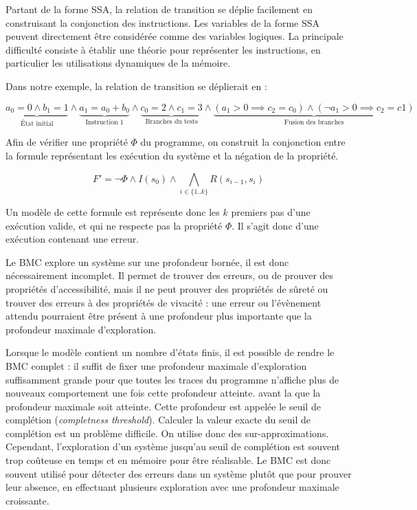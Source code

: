 Partant de la forme SSA, la relation de transition se déplie facilement
en construisant la conjonction des instructions. Les variables de la forme SSA
peuvent directement être considérée comme des variables logiques. La principale
difficulté consiste à établir une théorie pour représenter les
instructions, en particulier les utilisations dynamiques de la mémoire.

Dans notre exemple, la relation de transition se déplierait en :

\[
  \underbrace{a_0 = 0 \land b_1 = 1}_\text{État initial} \land
  \underbrace{a_1 = a_0 + b_0}_\text{Instruction 1} \land
  \underbrace{c_0 = 2 \land c_1 = 3}_\text{Branches du tests} \land
  \underbrace{(a_1 > 0 \implies c_2 = c_0)
    \land (\lnot a_1 > 0 \implies c_2 = c1)
  }_\text{Fusion des branches}
\]


Afin de vérifier une propriété \(\Phi\) du programme, on construit la
conjonction entre la formule représentant les exécution du système et la
négation de la propriété.

\[
F' = \lnot \Phi \land I(s_0) \land \bigwedge_{i\in \{1..k\}} R(s_{i-1}, s_i)
\]

Un modèle de cette formule est représente donc les \(k\) premiers pas d'une
exécution valide, et qui ne respecte pas la propriété \(\Phi\). Il s'agit donc
d'une exécution contenant une erreur.

Le BMC explore un système sur une profondeur bornée, il est donc nécessairement
incomplet. Il permet de trouver des erreurs, ou de prouver des propriétés
d'accessibilité, mais il ne peut prouver des propriétés de sûreté ou trouver des
erreurs à des propriétés de vivacité : une erreur ou l'évènement attendu
pourraient être présent à une profondeur plus importante que la profondeur
maximale d'exploration.

Lorsque le modèle contient un nombre d'états finis, il est possible de rendre le
BMC complet : il suffit de fixer une profondeur maximale d'exploration
suffisamment grande pour que toutes les traces du programme n'affiche plus de
nouveaux comportement une fois cette profondeur atteinte. avant la que la
profondeur maximale soit atteinte. Cette profondeur est appelée le seuil de
complétion (\emph{completness threshold}). Calculer la valeur exacte du seuil de
complétion est un problème difficile. On utilise donc des sur-approximations.
Cependant, l'exploration d'un système jusqu'au seuil de complétion est souvent
trop coûteuse en temps et en mémoire pour être réalisable. Le BMC est donc
souvent utilisé pour détecter des erreurs dans un système plutôt que pour
prouver leur absence, en effectuant plusieurs exploration avec une profondeur
maximale croissante.

